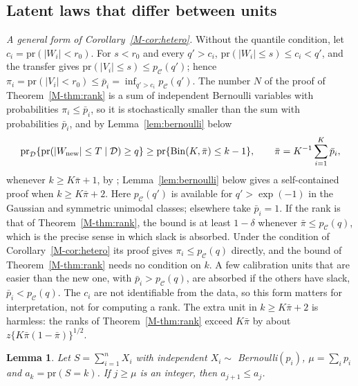 \documentclass[12pt]{article}
\renewcommand{\_}{\usc\allowbreak}
\newtheorem{lemma}{Lemma}
\theoremstyle{definition}
\numberwithin{equation}{section}
\newcommand{\pr}{\mathrm{pr}}
\newcommand{\E}{\mathcal{C}}
\newcommand{\Bin}{\mathrm{Bin}}
\begin{document}
\subsection{Latent laws that differ between units}\label{sec:s-hetero}

\emph{A general form of Corollary~\ref{M-cor:hetero}.} Without the quantile condition, let $c_i = \pr(|W_i| < r_0)$. For $s < r_0$ and every $q' > c_i$, $\pr(|W_i| \le s) \le c_i < q'$, and the transfer gives $\pr(|V_i| \le s) \le p_{\E}(q')$; hence $\pi_i = \pr(|V_i| < r_0) \le \bar p_i = \inf_{q' > c_i}p_{\E}(q')$. The number $N$ of the proof of Theorem~\ref{M-thm:rank} is a sum of independent Bernoulli variables with probabilities $\pi_i \le \bar p_i$, so it is stochastically smaller than the sum with probabilities $\bar p_i$, and by Lemma~\ref{lem:bernoulli} below
\[
\pr_{\mathcal D}\{\pr(|W_{\rm new}| \le T \mid \mathcal D) \ge q\} \ge \pr\{\Bin(K, \bar\pi) \le k - 1\}, \qquad \bar\pi = K^{-1}\sum_{i=1}^K\bar p_i,
\]
whenever $k \ge K\bar\pi + 1$, by \citet[Theorem~4]{hoeffding1956}; Lemma~\ref{lem:bernoulli} below gives a self-contained proof when $k \ge K\bar\pi + 2$. Here $p_{\E}(q')$ is available for $q' > \exp(-1)$ in the Gaussian and symmetric unimodal classes; elsewhere take $\bar p_i = 1$. If the rank is that of Theorem~\ref{M-thm:rank}, the bound is at least $1 - \delta$ whenever $\bar\pi \le p_{\E}(q)$, which is the precise sense in which slack is absorbed. Under the condition of Corollary~\ref{M-cor:hetero} its proof gives $\pi_i \le p_{\E}(q)$ directly, and the bound of Theorem~\ref{M-thm:rank} needs no condition on $k$. A few calibration units that are easier than the new one, with $\bar p_i > p_{\E}(q)$, are absorbed if the others have slack, $\bar p_i < p_{\E}(q)$. The $c_i$ are not identifiable from the data, so this form matters for interpretation, not for computing a rank. The extra unit in $k \ge K\bar\pi + 2$ is harmless: the ranks of Theorem~\ref{M-thm:rank} exceed $K\bar\pi$ by about $z\{K\bar\pi(1 - \bar\pi)\}^{1/2}$.

\begin{lemma}\label{lem:mode}
Let $S = \sum_{i=1}^n X_i$ with independent $X_i \sim$ Bernoulli$(p_i)$, $\mu = \sum_ip_i$ and $a_k = \pr(S = k)$. If $j \ge \mu$ is an integer, then $a_{j+1} \le a_j$.
\end{lemma}
\end{document}
